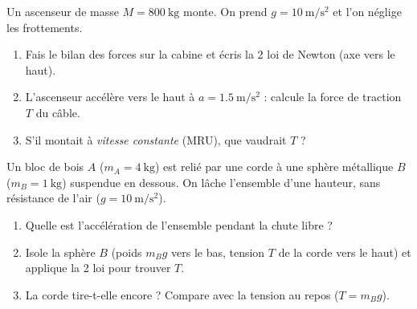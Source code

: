 \documentclass[11pt,a4paper]{article}
\newcommand{\vv}[1]{\vec{#1}}\newcommand{\ds}{\displaystyle}
\begin{document}

\begin{exo}
Un ascenseur de masse $M=\qty{800}{\kilogram}$ monte. On prend
$g=\qty{10}{\metre\per\second\squared}$ et l'on néglige les frottements.
\begin{enumerate}[label=\alph*)]
  \item Fais le bilan des forces sur la cabine et écris la 2 loi de Newton
        (axe vers le haut).
  \item L'ascenseur accélère vers le haut à $a=\qty{1.5}{\metre\per\second\squared}$ :
        calcule la force de traction $T$ du câble.
  \item S'il montait à \emph{vitesse constante} (MRU), que vaudrait $T$ ?
\end{enumerate}
\end{exo}

\begin{exo}
Un bloc de bois $A$ ($m_A=\qty{4}{\kilogram}$) est relié par une corde à une sphère
métallique $B$ ($m_B=\qty{1}{\kilogram}$) suspendue en dessous. On lâche l'ensemble
d'une hauteur, sans résistance de l'air ($g=\qty{10}{\metre\per\second\squared}$).
\begin{center}
\end{center}
\begin{enumerate}[label=\alph*)]
  \item Quelle est l'accélération de l'ensemble pendant la chute libre ?
  \item Isole la sphère $B$ (poids $m_B g$ vers le bas, tension $T$ de la corde vers le
        haut) et applique la 2 loi pour trouver $T$.
  \item La corde tire-t-elle encore ? Compare avec la tension au repos ($T=m_B g$).
\end{enumerate}
\end{exo}
\end{document}
